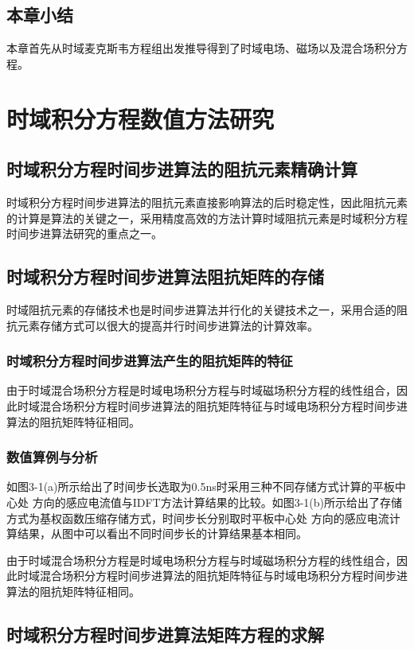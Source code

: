 \documentclass[doctor]{thesisUESTC}
\begin{document}
\section{本章小结}
本章首先从时域麦克斯韦方程组出发推导得到了时域电场、磁场以及混合场积分方程。

\chapter{时域积分方程数值方法研究}
\section{时域积分方程时间步进算法的阻抗元素精确计算}
时域积分方程时间步进算法的阻抗元素直接影响算法的后时稳定性，因此阻抗元素的计算是算法的关键之一，采用精度高效的方法计算时域阻抗元素是时域积分方程时间步进算法研究的重点之一。

\section{时域积分方程时间步进算法阻抗矩阵的存储}
时域阻抗元素的存储技术也是时间步进算法并行化的关键技术之一，采用合适的阻抗元素存储方式可以很大的提高并行时间步进算法的计算效率。

\subsection{时域积分方程时间步进算法产生的阻抗矩阵的特征}
由于时域混合场积分方程是时域电场积分方程与时域磁场积分方程的线性组合，因此时域混合场积分方程时间步进算法的阻抗矩阵特征与时域电场积分方程时间步进算法的阻抗矩阵特征相同。

\subsection{数值算例与分析}

如图3-1(a)所示给出了时间步长选取为0.5ns时采用三种不同存储方式计算的平板中心处 方向的感应电流值与IDFT方法计算结果的比较。如图3-1(b)所示给出了存储方式为基权函数压缩存储方式，时间步长分别取时平板中心处 方向的感应电流计算结果，从图中可以看出不同时间步长的计算结果基本相同。

由于时域混合场积分方程是时域电场积分方程与时域磁场积分方程的线性组合，因此时域混合场积分方程时间步进算法的阻抗矩阵特征与时域电场积分方程时间步进算法的阻抗矩阵特征相同。

\section{时域积分方程时间步进算法矩阵方程的求解}
\end{document}
